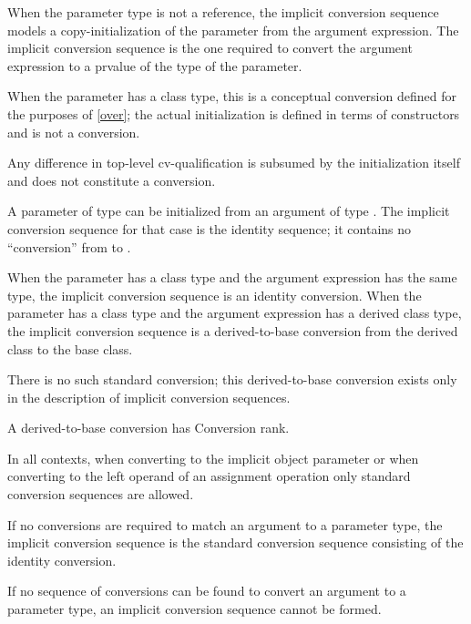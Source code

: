 \pnum
When the parameter type is not a reference, the implicit conversion
sequence models a copy-initialization of the parameter from the argument
expression.
The implicit conversion sequence is the one required to convert the
argument expression to a prvalue of the type of
the parameter.
\begin{note}
When the parameter has a class type, this is a conceptual conversion
defined for the purposes of \ref{over}; the actual initialization is
defined in terms of constructors and is not a conversion.
\end{note}
Any difference in top-level cv-qualification is
subsumed by the initialization itself and does not constitute a conversion.
\begin{example}
A parameter of type
can be initialized from an argument of type
.
The implicit conversion sequence for that case is the identity sequence; it
contains no ``conversion'' from
to
.
\end{example}
When the parameter has a class type and the argument expression has the
same type, the implicit conversion sequence is an identity conversion.
When the parameter has a class type and the argument expression has a
derived class type, the implicit conversion sequence is a
derived-to-base
%
conversion from the derived class to the base class.
\begin{note}
There is no such standard conversion; this derived-to-base conversion exists
only in the description of implicit conversion sequences.
\end{note}
A derived-to-base conversion has Conversion rank.

\pnum
In all contexts, when converting to the implicit object parameter
or when converting to the left operand of an assignment operation
only standard conversion sequences are allowed.

\pnum
If no conversions are required to match an argument to a
parameter type, the implicit conversion sequence is the standard
conversion sequence consisting of the identity conversion.

\pnum
If no sequence of conversions can be found to convert an argument
to a parameter type, an implicit conversion sequence cannot be formed.

